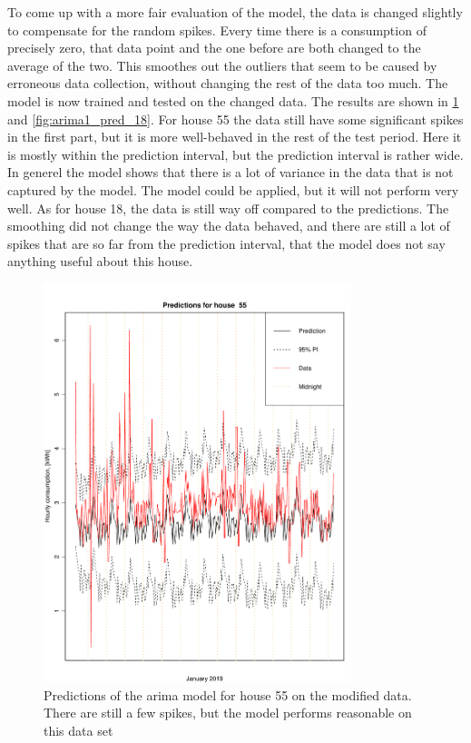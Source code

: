 \noindent To come up with a more fair evaluation of the model, the data is changed slightly to compensate for the random spikes. Every time there is a consumption of precisely zero, that data point and the one before are both changed to the average of the two. This smoothes out the outliers that seem to be caused by erroneous data collection, without changing the rest of the data too much. The model is now trained and tested on the changed data. The results are shown in \cref{fig:arima1_pred_55} and \cref{fig:arima1_pred_18}. For house 55 the data still have some significant spikes in the first part, but it is more well-behaved in the rest of the test period. Here it is mostly within the prediction interval, but the prediction interval is rather wide. In generel the model shows that there is a lot of variance in the data that is not captured by the model. The model could be applied, but it will not perform very well. As for house 18, the data is still way off compared to the predictions. The smoothing did not change the way the data behaved, and there are still a lot of spikes that are so far from the prediction interval, that the model does not say anything useful about this house.


\begin{figure}
    \centering
    \includegraphics[width=0.8\textwidth]{../../../figures/arimax/arima2_pred_55.pdf}
    \caption{Predictions of the arima model for house 55 on the modified data. There are still a few spikes, but the model performs reasonable on this data set}
    \label{fig:arima1_pred_55}
\end{figure}

